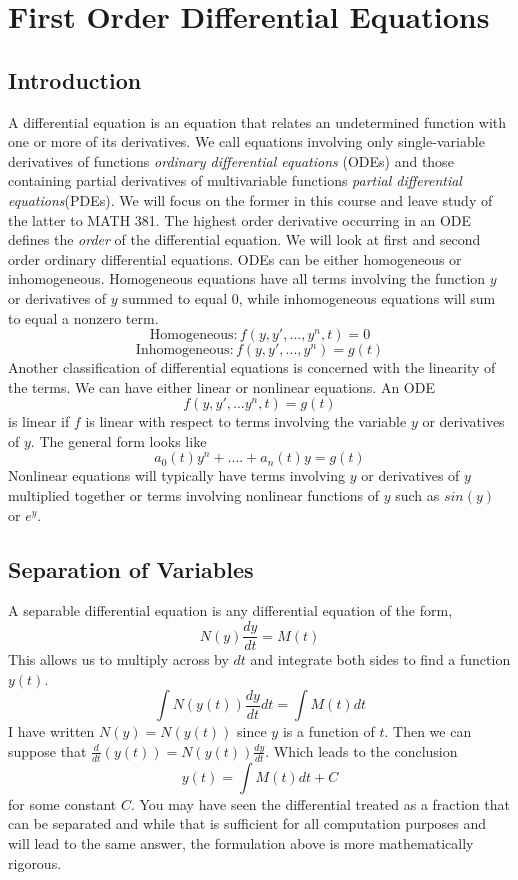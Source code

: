
\chapter{First Order Differential Equations}
\setcounter{exercisecounter}{0}

\setcounter{thmcounter}{1}
\section{Introduction}
A differential equation is an equation that relates an undetermined function with one or more of its derivatives. We call equations involving only single-variable derivatives of functions \textit{ordinary differential equations} (ODEs) and those containing partial derivatives of multivariable functions \textit{partial differential equations}(PDEs). We will focus on the former in this course and leave study of the latter to MATH 381. \newline
\newline
The highest order derivative occurring in an ODE defines the \textit{order} of the differential equation. We will look at first and second order ordinary differential equations. ODEs can be either homogeneous or inhomogeneous. Homogeneous equations have all terms involving the function $y$ or derivatives of $y$ summed to equal $0$, while inhomogeneous equations will sum to equal a nonzero term. 
\[\mbox{Homogeneous}: f(y, y',...,y^n, t) = 0\]
\[\mbox{Inhomogeneous}: f(y, y',...,y^n) = g(t)\]
\newline
Another classification of differential equations is concerned with the linearity of the terms. We can have either linear or nonlinear equations. An ODE
\[f(y, y',...y^n,t) = g(t)\]
is linear if $f$ is linear with respect to terms involving the variable $y$ or derivatives of $y$. The general form looks like
\[a_0(t)y^n+....+a_n(t)y = g(t)\]
Nonlinear equations will typically have terms involving $y$ or derivatives of $y$ multiplied together or terms involving nonlinear functions of $y$ such as $sin(y)$ or $e^y$.
\newline


\section{Separation of Variables}
A separable differential equation is any differential equation of the form,
\[N(y)\frac{dy}{dt} = M(t)\]
This allows us to multiply across by $dt$ and integrate both sides to find a function $y(t)$. 
\[\int N(y(t))\frac{dy}{dt}dt = \int M(t)dt\]
I have written $N(y) = N(y(t))$ since $y$ is a function of $t$. Then we can suppose that $\frac{d}{dt}(y(t)) = N(y(t))\frac{dy}{dt}$. Which leads to the conclusion
\[y(t) = \int M(t)dt + C\]
for some constant $C$. You may have seen the differential treated as a fraction that can be separated and while that is sufficient for all computation purposes and will lead to the same answer, the formulation above is more mathematically rigorous. 

